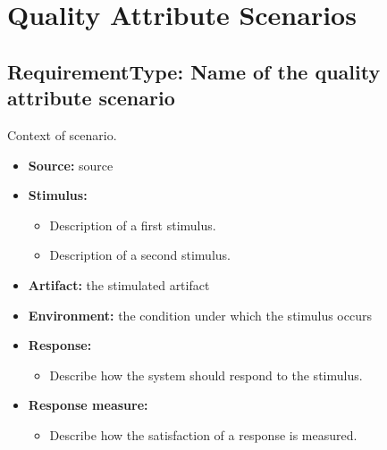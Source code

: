 \documentclass{sareport}
\begin{document}
\chapter{Quality Attribute Scenarios}


\section{RequirementType: Name of the quality attribute scenario}

Context of scenario.

\begin{itemize}
	\item \textbf{Source:} source
	\item \textbf{Stimulus:}
	\begin{itemize}
		\item Description of a first stimulus.
		\item Description of a second stimulus.
	\end{itemize}
	
	\item \textbf{Artifact:} the stimulated artifact
	\item \textbf{Environment:} the condition under which the stimulus occurs
	\item \textbf{Response:}
	\begin{itemize}
		\item Describe how the system should respond to the stimulus.
	\end{itemize}
	
	\item \textbf{Response measure:}
	\begin{itemize}
		\item Describe how the satisfaction of a response is measured.
	\end{itemize}
\end{itemize}
\end{document}
